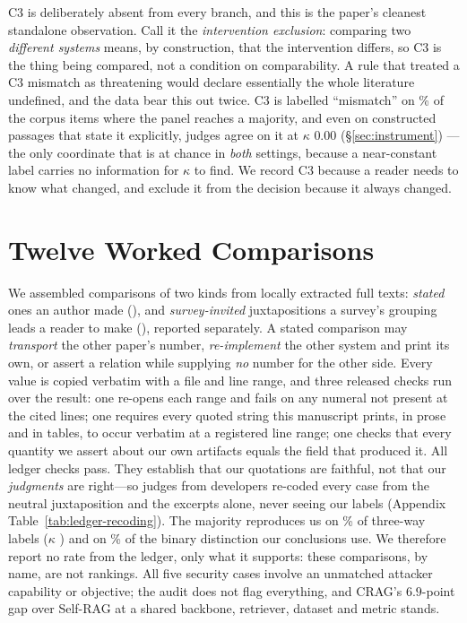 \documentclass[11pt]{article}
\begin{document}
C3 is deliberately absent from every branch, and this is the paper's cleanest
standalone observation. Call it the \emph{intervention exclusion}: comparing two
\emph{different systems} means, by construction, that the intervention differs,
so C3 is the thing being compared, not a condition on comparability. A rule that
treated a C3 mismatch as threatening would declare essentially the whole
literature undefined, and the data bear this out twice. C3 is labelled
``mismatch'' on \CThreeMismatchMaj\% of the corpus items where the panel reaches
a majority, and even on constructed passages that state it explicitly, judges
agree on it at $\kappa$ $0.00$ (\S\ref{sec:instrument}) --- the only coordinate
that is at chance in \emph{both} settings, because a near-constant label carries
no information for $\kappa$ to find. We record C3 because a reader needs to know
what changed, and exclude it from the decision because it always changed.

\section{Twelve Worked Comparisons}
\label{sec:cases}

We assembled comparisons of two kinds from \FrameScreened{} locally extracted
full texts: \emph{stated} ones an author made (\LedgerStated{}), and
\emph{survey-invited} juxtapositions a survey's grouping leads a reader to make
(\LedgerInvited{}), reported separately. A stated comparison may
\emph{transport} the other paper's number, \emph{re-implement} the other system
and print its own, or assert a relation while supplying \emph{no} number for the
other side. Every value is copied
verbatim with a file and line range, and three released checks run over the
result: one re-opens each range and fails on any numeral not present at the
cited lines; one requires every quoted string this manuscript prints, in prose
and in tables, to occur verbatim at a registered line range; one checks that
every quantity we assert about our own artifacts equals the field that produced
it. All \VerifChecks{} ledger checks pass. They establish that our quotations
are faithful, not that our \emph{judgments} are right---so \RecJudges{} judges
from \RecDevs{} developers re-coded every case from the neutral juxtaposition
and the excerpts alone, never seeing our labels (Appendix
Table~\ref{tab:ledger-recoding}). The majority reproduces us on
\RecThreeWayPct\% of three-way labels ($\kappa$ \RecThreeWayK{}) and on
\RecBinaryPct\% of the binary distinction our conclusions use. We therefore
report no rate from the ledger, only what it supports: these comparisons, by
name, are not rankings. All five security cases involve an unmatched attacker
capability or objective; the audit does not flag everything, and CRAG's
$6.9$-point gap over Self-RAG at a shared backbone, retriever, dataset and
metric stands.
\end{document}
